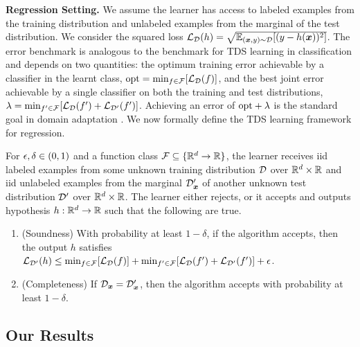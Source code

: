 \documentclass[11pt]{article} %
\numberwithin{equation}{section}
\begin{document}


\noindent\textbf{Regression Setting.} We assume the learner has access to labeled examples from the training distribution and unlabeled examples from the marginal of the test distribution. We consider the squared loss ${\mathcal{L}}_{{\mathcal{D}}}(h) = \sqrt{\mathbb{E}_{({\bm{x}},y)\sim {\mathcal{D}}}[(y-h({\bm{x}}))^2]}$. The error benchmark is analogous to the benchmark for TDS learning in classification \cite{klivans2023testable} and depends on two quantities: the optimum training error achievable by a classifier in the learnt class, $\mathrm{opt} = \min_{f\in{\mathcal{F}}}[{\mathcal{L}}_{{\mathcal{D}}}(f)]$, and the best joint error achievable by a single classifier on both the training and test distributions, $\lambda = \min_{f'\in{\mathcal{F}}}[{\mathcal{L}}_{{\mathcal{D}}}(f')+{\mathcal{L}}_{{\mathcal{D}}'}(f')]$. Achieving an error of $\mathrm{opt} + \lambda$ is the standard goal in domain adaptation \cite{ben2006analysis,blitzer2007learning,mansour2009domadapt}. We now formally define the TDS learning framework for regression.

\begin{definition}
    For ${\epsilon},\delta\in(0,1)$ and a function class ${\mathcal{F}}\subseteq\{\mathbb{R}^d\to \mathbb{R}\}$, the learner receives iid labeled examples from some unknown training distribution ${\mathcal{D}}$ over $\mathbb{R}^d\times \mathbb{R}$ and iid unlabeled examples from the marginal ${\mathcal{D}}_{{\bm{x}}}'$ of another unknown test distribution ${\mathcal{D}}'$ over $\mathbb{R}^d\times \mathbb{R}$. The learner  either rejects, or it accepts and outputs hypothesis $h:\mathbb{R}^d\to \mathbb{R}$ such that the following are true.
    \begin{enumerate}
        \item (Soundness) With probability at least $1-\delta$, if the algorithm accepts, then the output $h$ satisfies ${\mathcal{L}}_{{\mathcal{D}}'}(h) \le \min_{f\in{\mathcal{F}}}[{\mathcal{L}}_{{\mathcal{D}}}(f)] + \min_{f'\in{\mathcal{F}}}[{\mathcal{L}}_{{\mathcal{D}}}(f')+{\mathcal{L}}_{{\mathcal{D}}'}(f')] + {\epsilon}$.
        \item (Completeness) If ${\mathcal{D}}_{{\bm{x}}} = {\mathcal{D}}_{{\bm{x}}}'$, then the algorithm accepts with probability at least $1-\delta$.
    \end{enumerate}
\end{definition}


\subsection{Our Results} 
\end{document}

